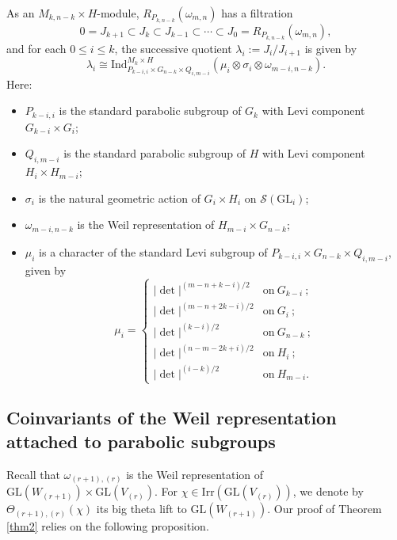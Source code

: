 \documentclass[11pt,reqno]{amsart}
\renewcommand{\1}{{\mathbf{1}}} \newcommand{\sB}{{\mathscr{B}}}
\newcommand{\CS}{{\mathcal {S}}} \newcommand{\CT}{{\mathcal {T}}}
\newcommand{\GL}{{\mathrm{GL}}}\newcommand{\G}{{\mathrm{G}}}
\newcommand{\Ind}{{\mathrm{Ind}}} \newcommand{\ind}{{\mathrm{ind}}}
\newcommand{\Irr}{{\mathrm{Irr}}} \newcommand{\cInd}{{\mathrm{c-Ind}}}
\theoremstyle{plain}
\theoremstyle{definition}
\numberwithin{equation}{section}
\begin{document}
\begin{prop}\label{prop jacquet mod}
As an $M_{k,n-k}\times H$-module, $R_{P_{k,n-k}}(\omega_{m,n})$ has a filtration
$$0=J_{k+1}\subset J_k\subset J_{k-1}\subset\cdots\subset J_0=R_{P_{k,n-k}}(\omega_{m,n}),$$ and for each $0\leq i\leq k$, the successive quotient $\lambda_i:=J_i/J_{i+1}$ is given by
$$\lambda_i\cong\Ind_{P_{k-i,i}\times G_{n-k}\times Q_{i,m-i}}^{M_k\times H}\left(\mu_{i}\otimes\sigma_i\otimes\omega_{m-i,n-k}\right).$$ Here:
\begin{itemize}
\item $P_{k-i,i}$ is the standard parabolic subgroup of $G_k$ with Levi component $G_{k-i}\times G_i$;
\item $Q_{i,m-i}$ is the standard parabolic subgroup of $H$ with Levi component $H_{i}\times H_{m-i}$;
\item $\sigma_i$ is the natural geometric action of $G_i\times H_i$ on $\CS(\GL_i)$;
\item $\omega_{m-i,n-k}$ is the Weil representation of $H_{m-i}\times G_{n-k}$;
\item $\mu_{i}$ is a character of the standard Levi subgroup of $P_{k-i,i}\times G_{n-k}\times Q_{i,m-i}$, given by
$$\mu_{i}=\begin{cases} 
|\det|^{(m-n+k-i)/{2}} &\textrm{on}\ G_{k-i}\ ;\\
|\det|^{(m-n+2k-i)/{2}} &\textrm{on}\ G_{i}\ ; \\
|\det|^{(k-i)/{2}} &\textrm{on}\ G_{n-k}\ ; \\
|\det|^{(n-m-2k+i)/{2}} &\textrm{on}\ H_{i}\ ; \\
|\det|^{(i-k)/{2}} &\textrm{on}\ H_{m-i}.
 \end{cases}$$
\end{itemize}
\end{prop}

\subsection{Coinvariants of the Weil representation attached to parabolic subgroups} Recall that $\omega_{(r+1),(r)}$ is the Weil representation of $\GL(W_{(r+1)})\times\GL(V_{(r)})$. For $\chi\in\Irr(\GL(V_{(r)}))$, we denote by $\Theta_{(r+1),(r)}(\chi)$ its big theta lift to $\GL(W_{(r+1)})$.
Our proof of Theorem \ref{thm2} relies on the following proposition.
\end{document}
